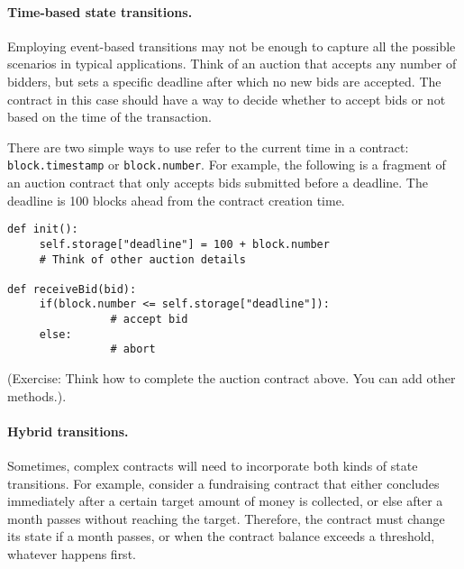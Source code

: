\documentclass[10pt,twocolumn,letterpaper]{article}
\begin{document}
\paragraph{Time-based state transitions.}
Employing event-based transitions may not be enough to capture all the possible scenarios in typical applications. Think of an auction that accepts any number of bidders, but sets a specific deadline after which no new bids are accepted. The contract in this case should have a way to decide whether to accept bids or not based on the time of the transaction.

There are two simple ways to use refer to the current time in a contract: \texttt{block.timestamp} or \texttt{block.number}. For example, the following is a fragment of an auction contract that only accepts bids submitted before a deadline. The deadline is 100 blocks ahead from the contract creation time.

\begin{mdframed}
\begin{verbatim}
def init():
     self.storage["deadline"] = 100 + block.number                
     # Think of other auction details  

def receiveBid(bid):
     if(block.number <= self.storage["deadline"]):
                # accept bid
     else:
                # abort
\end{verbatim}
\end{mdframed}                

(Exercise: Think how to complete the auction contract above. You can add other methods.).

\paragraph{Hybrid transitions.}
Sometimes, complex contracts will need to incorporate both kinds of state transitions. For example, consider a fundraising contract that either concludes immediately after a certain target amount of money is collected, or else after a month passes without reaching the target. Therefore, the contract must change its state if a month passes, or when the contract balance exceeds a threshold, whatever happens first.\\
\end{document}
